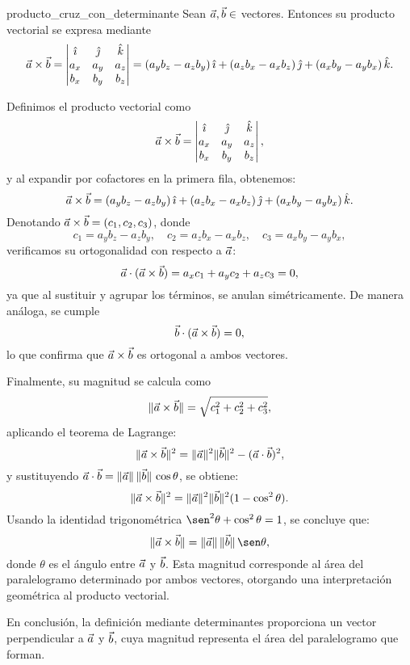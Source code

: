 \begin{theorem}{}{producto_cruz_con_determinante}
    Sean $\vec{a}, \vec{b} \in$ \RR[3] vectores. Entonces su producto vectorial se expresa mediante
    $$\vec{a} \times \vec{b} =
    \begin{vmatrix}
        \hat{\imath} & \hat{\jmath} & \hat{k} \\
        a_x   & a_y   & a_z   \\
        b_x   & b_y   & b_z
    \end{vmatrix}
    = (a_y b_z - a_z b_y)\,\hat{\imath} + (a_z b_x - a_x b_z)\,\hat{\jmath} + (a_x b_y - a_y b_x)\,\hat{k}.$$
    \begin{demo}
        Definimos el producto vectorial como
        $$\vec{a} \times \vec{b} =
        \begin{vmatrix}
            \hat{\imath} & \hat{\jmath} & \hat{k} \\
            a_x   & a_y   & a_z   \\
            b_x   & b_y   & b_z
        \end{vmatrix},$$
        y al expandir por cofactores en la primera fila, obtenemos:
        $$\vec{a} \times \vec{b} =
        (a_y b_z - a_z b_y)\,\hat{\imath}
        + (a_z b_x - a_x b_z)\,\hat{\jmath}
        + (a_x b_y - a_y b_x)\,\hat{k}.$$
        Denotando $\vec{a} \times \vec{b} = (c_1, c_2, c_3)$, donde
        $$c_1 = a_y b_z - a_z b_y,\quad c_2 = a_z b_x - a_x b_z,\quad c_3 = a_x b_y - a_y b_x,$$
        verificamos su ortogonalidad con respecto a $\vec{a}$:
        $$\vec{a} \cdot (\vec{a} \times \vec{b}) = a_x c_1 + a_y c_2 + a_z c_3 = 0,$$
        ya que al sustituir y agrupar los términos, se anulan simétricamente. De manera análoga, se cumple
        $$\vec{b} \cdot (\vec{a} \times \vec{b}) = 0,$$
        lo que confirma que $\vec{a} \times \vec{b}$ es ortogonal a ambos vectores.

        Finalmente, su magnitud se calcula como
        $$\|\vec{a} \times \vec{b}\| = \sqrt{c_1^2 + c_2^2 + c_3^2},$$
        aplicando el teorema de Lagrange:
        $$\|\vec{a} \times \vec{b}\|^2 = \|\vec{a}\|^2 \|\vec{b}\|^2 - (\vec{a} \cdot \vec{b})^2,$$
        y sustituyendo \(\vec{a} \cdot \vec{b} = \|\vec{a}\|\,\|\vec{b}\|\,\cos\theta\), se obtiene:
        $$\|\vec{a} \times \vec{b}\|^2 = \|\vec{a}\|^2 \|\vec{b}\|^2 (1 - \cos^2\theta).$$
        Usando la identidad trigonométrica \(\sen^2\theta + \cos^2\theta = 1\), se concluye que:
        $$\|\veca \times \vecb\| = \|\veca\|\,\|\vecb\|\,\sen\theta,$$
        donde $\theta$ es el ángulo entre $\vec{a}$ y $\vec{b}$. Esta magnitud corresponde al área del paralelogramo determinado por ambos vectores, otorgando una interpretación geométrica al producto vectorial.

        En conclusión, la definición mediante determinantes proporciona un vector perpendicular a $\vec{a}$ y $\vec{b}$, cuya magnitud representa el área del paralelogramo que forman.
    \end{demo}
\end{theorem}


